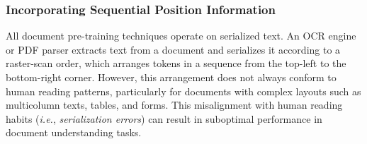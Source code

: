 




\subsubsection{Incorporating Sequential Position Information}

All document pre-training techniques operate on serialized text. An \ac{OCR} engine or PDF parser extracts text from a document and serializes it according to a raster-scan order, which arranges tokens in a sequence from the top-left to the bottom-right corner. However, this arrangement does not always conform to human reading patterns, particularly for documents with complex layouts such as multicolumn texts, tables, and forms. This misalignment with human reading habits (\textit{i.e.}, \textit{serialization errors}) can result in suboptimal performance in document understanding tasks. 

